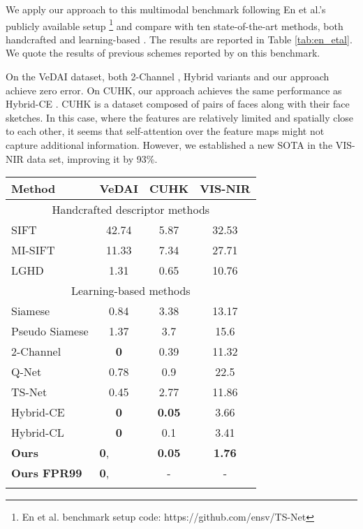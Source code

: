 \documentclass[10pt,journal]{IEEEtran}\usepackage{amsfonts}
\begin{document}
We apply our approach to this multimodal benchmark following En et al.'s
\cite{TS-net} publicly available setup \footnote{En et al. benchmark setup code: https://github.com/ensv/TS-Net} and compare
with ten state-of-the-art methods, both handcrafted \cite{SIFT, MI_SIFT,
LGHD} and learning-based \cite{SiameseCrossSpectral, Q-net, TS-net,
multisensor}. The results are reported in Table \ref{tab:en_etal}. We quote
the results of previous schemes reported by \cite{TS-net, multisensor} on
this benchmark.

On the VeDAI dataset, both 2-Channel \cite{SiameseCrossSpectral}, Hybrid
\cite{multisensor} variants and our approach achieve zero error. On CUHK,
our approach achieves the same performance as Hybrid-CE \cite{multisensor}.
CUHK is a dataset composed of pairs of faces along with their face sketches.
In this case, where the features are relatively limited and spatially close
to each other, it seems that self-attention over the feature maps might not
capture additional information. However, we established a new SOTA in the
VIS-NIR data set, improving it by 93\%.
\begin{table*}[tbh]
\centering
\par
\begin{tabular}{lccc}
\toprule Method & VeDAI & CUHK & VIS-NIR \\
\midrule
\multicolumn{4}{c}{Handcrafted descriptor methods} \\
SIFT\cite{SIFT} & 42.74 & 5.87 & 32.53 \\
MI-SIFT \cite{MI_SIFT} & 11.33 & 7.34 & 27.71 \\
LGHD\cite{LGHD} & 1.31 & 0.65 & 10.76 \\
\midrule
\multicolumn{4}{c}{Learning-based methods} \\
Siamese\cite{SiameseCrossSpectral} & 0.84 & 3.38 & 13.17 \\
Pseudo Siamese\cite{SiameseCrossSpectral} & 1.37 & 3.7 & 15.6 \\
2-Channel\cite{SiameseCrossSpectral} & \textbf{0} & 0.39 & 11.32 \\
Q-Net\cite{Q-net} & 0.78 & 0.9 & 22.5 \\
TS-Net\cite{TS-net} & 0.45 & 2.77 & 11.86 \\
Hybrid-CE \cite{multisensor} & \textbf{0} & \textbf{0.05} & 3.66 \\
Hybrid-CL \cite{multisensor} & \textbf{0} & 0.1 & 3.41 \\
\textbf{Ours} & \multicolumn{1}{l}{\textbf{0}, } & \textbf{0.05}
& \textbf{1.76} \\
\textbf{Ours FPR99} & \multicolumn{1}{l}{\textbf{0}, } & - & - \\
\bottomrule &  &  &
\end{tabular}\caption{Patch matching results evaluated on En et al. Benchmark
\protect\cite{TS-net} consisting of three multimodal datasets sampled on a
uniform grid layout. The score is given in terms of FPR95. On the VeDAI
dataset, we performed a stricter evaluation using FPR99 and reported the
standard deviation out of 10 tests.}
\label{tab:en_etal}
\end{table*}
\end{document}
